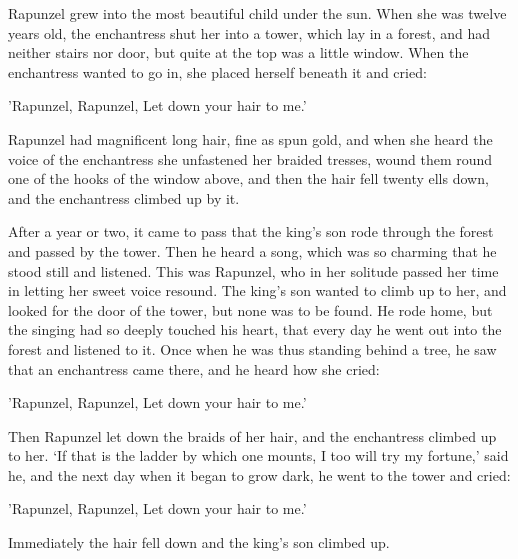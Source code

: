 Rapunzel grew into the most beautiful child under the sun. When she was twelve years old, the enchantress shut her into a tower, which lay in a forest, and had neither stairs nor door, but quite at the top was a little window. When the enchantress wanted to go in, she placed herself beneath it and cried:

'Rapunzel, Rapunzel,
Let down your hair to me.'

Rapunzel had magnificent long hair, fine as spun gold, and when she heard the voice of the enchantress she unfastened her braided tresses, wound them round one of the hooks of the window above, and then the hair fell twenty ells down, and the enchantress climbed up by it.

After a year or two, it came to pass that the king's son rode through the forest and passed by the tower. Then he heard a song, which was so charming that he stood still and listened. This was Rapunzel, who in her solitude passed her time in letting her sweet voice resound. The king's son wanted to climb up to her, and looked for the door of the tower, but none was to be found. He rode home, but the singing had so deeply touched his heart, that every day he went out into the forest and listened to it. Once when he was thus standing behind a tree, he saw that an enchantress came there, and he heard how she cried:

'Rapunzel, Rapunzel,
Let down your hair to me.'

Then Rapunzel let down the braids of her hair, and the enchantress climbed up to her. `If that is the ladder by which one mounts, I too will try my fortune,' said he, and the next day when it began to grow dark, he went to the tower and cried:

'Rapunzel, Rapunzel,
Let down your hair to me.'

Immediately the hair fell down and the king's son climbed up.


